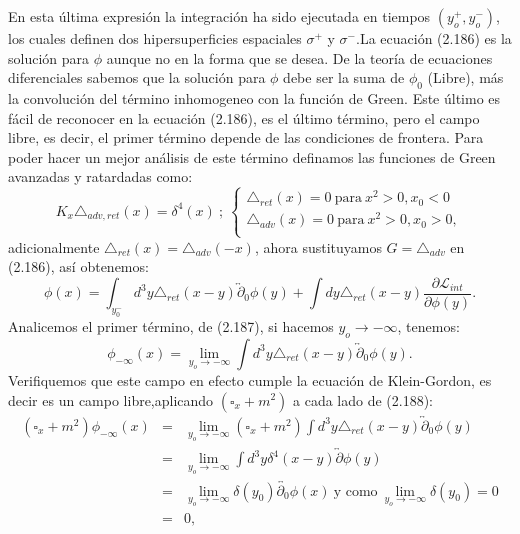 En esta última expresión la integración ha sido ejecutada en tiempos $(y_{o}^{+},y_{o}^{-})$, los cuales definen dos hipersuperficies espaciales $\sigma^+$ y $\sigma^-$.La ecuación (2.186) es la solución para $\phi$ aunque no en la forma que se desea. De la teoría de ecuaciones diferenciales sabemos que la solución para $\phi$ debe ser la suma de $\phi_0$ (Libre), más la convolución del término inhomogeneo con la función de Green. Este último es fácil de reconocer en la ecuación (2.186), es el último término, pero el campo libre, es decir, el primer término depende de las condiciones de frontera.  Para poder hacer un mejor análisis de este término definamos las funciones de Green avanzadas y ratardadas como:
\[   K_x\triangle_{adv,ret}(x)=\delta^4(x)\ ;\
     \begin{cases}
       \triangle_{ret}(x)=0\  \text{para}\ x^2>0,x_0<0\\
       \triangle_{adv}(x)=0\  \text{para}\ x^2>0,x_0>0 ,\\
      
     \end{cases}
\]
adicionalmente $\triangle_{ret}(x)=\triangle_{adv}(-x)$, ahora sustituyamos $G=\triangle_{adv}$ en (2.186), así obtenemos:
\begin{equation}
\phi(x)=\int_{y_{0}^{-}}d^{3}y\triangle_{ret}(x-y)\overleftrightarrow{\partial}_{0}\phi(y)+\int dy\triangle_{ret}(x-y)\frac{\partial\mathcal{L}_{int}}{\partial\phi(y)} .
\end{equation}
Analicemos el primer término, de (2.187), si hacemos $y_o\to -\infty$, tenemos:
\begin{equation}
\phi_{-\infty}(x)=\lim_{y_{o}\to-\infty}\int d^{3}y\triangle_{ret}(x-y)\overleftrightarrow{\partial}_{0}\phi(y) .
\end{equation}
Verifiquemos que este campo en efecto cumple la ecuación de Klein-Gordon, es decir es un campo libre,aplicando $(\square_x +m^2)$ a cada lado de (2.188):
\begin{eqnarray}
\nonumber (\square_{x}+m^{2})\phi_{-\infty}(x)&=&\lim_{y_{o}\to-\infty}(\square_{x}+m^{2})\int d^{3}y\triangle_{ret}(x-y)\overleftrightarrow{\partial}_{0}\phi(y)\\
\nonumber &=&\lim_{y_{o}\to-\infty}\int d^{3}y\delta^{4}(x-y)\overleftrightarrow{\partial}\phi(y)\\
\nonumber &=& \lim_{y_{o}\to-\infty}\delta(y_{0})\overleftrightarrow{\partial_{0}}\phi(x)\ \text{y como}\ \lim_{y_{o}\to-\infty}\delta(y_{0})=0\\
&=&0 ,
\end{eqnarray}
